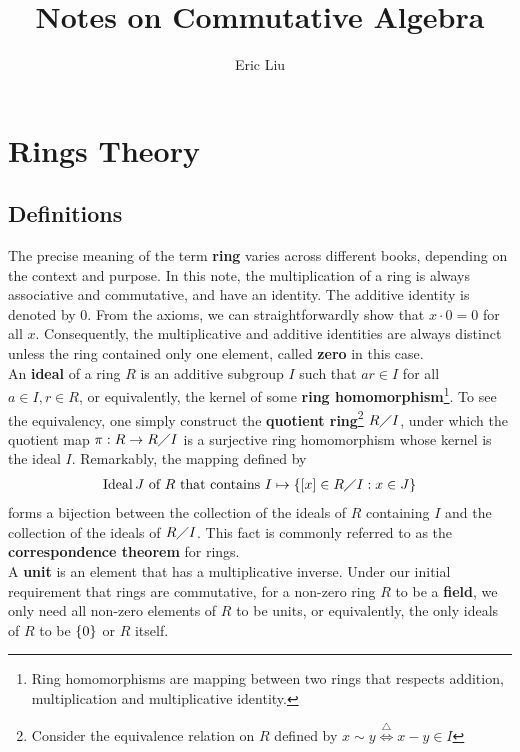 \documentclass{report}
\title{Notes on Commutative Algebra}
\author{Eric Liu}
\date{}
\begin{document}
\maketitle
\newpage%

\tableofcontents
\pagebreak
\chapter{Rings Theory} 
\section{Definitions}
The precise meaning of the term \textbf{ring} varies across different books, depending on the context and purpose. In this note, the multiplication of a ring is always associative and commutative, and have an identity. The additive identity is denoted by $0$. From the axioms, we can straightforwardly show that $x\cdot 0 = 0$ for all $x$. Consequently, the multiplicative and additive identities are always distinct unless the ring contained only one element, called  \textbf{zero} in this case.\\

An \textbf{ideal} of a ring $R$ is an additive subgroup $I$ such that $ar \in I$ for all $a \in I,  r \in R$, or equivalently, the kernel of some \textbf{ring homomorphism}\footnote{Ring homomorphisms are mapping between two rings that respects addition, multiplication and  multiplicative identity.}. To see the equivalency, one simply construct the \textbf{quotient ring}\footnote{Consider the equivalence relation on $R$ defined by  $x\sim  y\overset{\triangle}{\iff } x-y \in I$} $R\diagup I$, under which the quotient map $\pi: R \rightarrow R \diagup  I$ is a surjective ring homomorphism whose kernel is the ideal $I$. Remarkably, the mapping defined by 
 \begin{align*}
\operatorname{Ideal }J\text{ of $R$ that contains }I \mapsto \{ [x]\in R\diagup I: x\in J \}
\end{align*}
forms a bijection between the collection of the ideals of $R$ containing  $I$ and the collection of the ideals of $R\diagup I$. This fact is commonly referred to as the \textbf{correspondence theorem} for rings. \\

A \textbf{unit} is an element that has a multiplicative inverse. Under our initial requirement that rings are commutative, for a non-zero ring $R$ to be a \textbf{field}, we only need all non-zero elements of $R$ to be units, or equivalently, the only ideals of $R$ to be $\{ 0 \}$ or $R$ itself.\\
\end{document}
